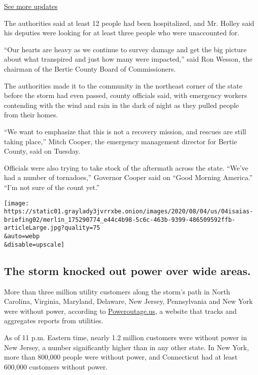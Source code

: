 \href{https://www.nytimes3xbfgragh.onion/2020/08/04/us/isaias-storm-updates.html?action=click\&pgtype=Article\&state=default\&region=MAIN_CONTENT_1\&context=storylines_live_updates}{See
more updates}

The authorities said at least 12 people had been hospitalized, and Mr.
Holley said his deputies were looking for at least three people who were
unaccounted for.

``Our hearts are heavy as we continue to survey damage and get the big
picture about what transpired and just how many were impacted,'' said
Ron Wesson, the chairman of the Bertie County Board of Commissioners.

The authorities made it to the community in the northeast corner of the
state before the storm had even passed, county officials said, with
emergency workers contending with the wind and rain in the dark of night
as they pulled people from their homes.

``We want to emphasize that this is not a recovery mission, and rescues
are still taking place,'' Mitch Cooper, the emergency management
director for Bertie County, said on Tuesday.

Officials were also trying to take stock of the aftermath across the
state. ``We've had a number of tornadoes,'' Governor Cooper said on
``Good Morning America.'' ``I'm not sure of the count yet.''

\texttt{[image: https://static01.graylady3jvrrxbe.onion/images/2020/08/04/us/04isaias-briefing02/merlin\_175290774\_e44c4b98-5c6c-463b-9399-486509592ffb-articleLarge.jpg?quality=75\\\&auto=webp\\\&disable=upscale]}

\hypertarget{the-storm-knocked-out-power-over-wide-areas}{%
\subsection{The storm knocked out power over wide
areas.}\label{the-storm-knocked-out-power-over-wide-areas}}

More than three million utility customers along the storm's path in
North Carolina, Virginia, Maryland, Delaware, New Jersey, Pennsylvania
and New York were without power, according to
\href{https://poweroutage.us/}{Poweroutage.us}, a website that tracks
and aggregates reports from utilities.

As of 11 p.m. Eastern time, nearly 1.2 million customers were without
power in New Jersey, a number significantly higher than in any other
state. In New York, more than 800,000 people were without power, and
Connecticut had at least 600,000 customers without power.


